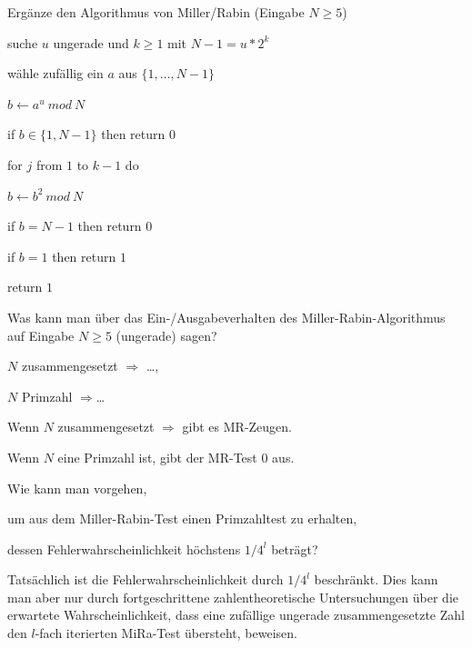 \documentclass[avery5371, frame]{flashcards}
\begin{document}
\begin{flashcard}[Primzahlen]{Ergänze den Algorithmus von Miller/Rabin (Eingabe $N\geq 5$)}
    \begin{itemize*}
        \item[] suche $u$ ungerade und $k\geq 1$ mit $N-1 =u*2^k$
        \item[] wähle zufällig ein $a$ aus $\{1 ,\dots,N-1\}$
        \item[] $b \leftarrow a^u\ mod\ N$ %
        \item[] if $b\in\{1,N-1\}$ then return $0$
        \item[] for $j$ from $1$ to $k-1$ do %
        \begin{itemize*}
            \item[] $b\leftarrow b^2\ mod\ N$
        \end{itemize*}
        \item[] if $b=N-1$ then return $0$
        \item[] if $b=1$ then return $1$
        \item[] return $1$
    \end{itemize*}
\end{flashcard}

\begin{flashcard}[Primzahlen]{Was kann man über das Ein-/Ausgabeverhalten des Miller-Rabin-Algorithmus auf Eingabe $N\geq 5$ (ungerade) sagen?

        $N$ zusammengesetzt $\Rightarrow$ \dots,

        $N$ Primzahl $\Rightarrow$\dots}
    Wenn $N$ zusammengesetzt $\Rightarrow$ gibt es MR-Zeugen.

    Wenn $N$ eine Primzahl ist, gibt der MR-Test $0$ aus.
\end{flashcard}

\begin{flashcard}[Primzahlen]{Wie kann man vorgehen,

        um aus dem Miller-Rabin-Test einen Primzahltest zu erhalten,

        dessen Fehlerwahrscheinlichkeit höchstens $1/4^l$ beträgt?}
    Tatsächlich ist die Fehlerwahrscheinlichkeit durch $1/4^l$ beschränkt. Dies kann man aber nur durch fortgeschrittene zahlentheoretische Untersuchungen über die erwartete Wahrscheinlichkeit, dass eine zufällige ungerade zusammengesetzte Zahl den $l$-fach iterierten MiRa-Test übersteht, beweisen.
\end{flashcard}
\end{document}
